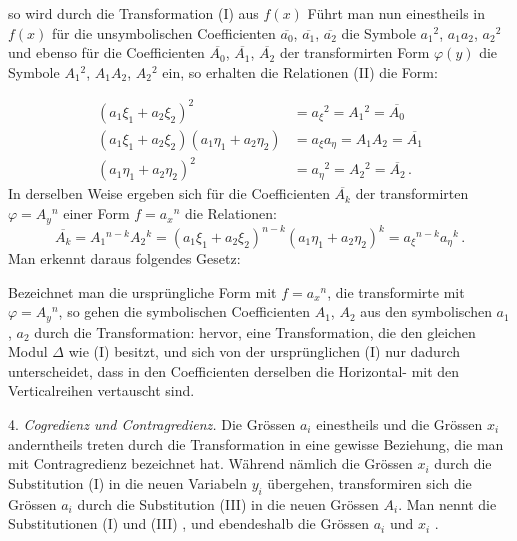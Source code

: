 so wird durch die Transformation (I) aus $f(x)$
Führt man nun einestheils in $f(x)$ für die unsymbolischen Coefficienten $\overline{a_0}$, $\overline{a_1}$, $\overline{a_2}$ die Symbole $a_1{}^2$, $a_1a_2$, $a_2{}^2$ und ebenso für die Coefficienten $\overline{A_0}$, $\overline{A_1}$, $\overline{A_2}$ der transformirten Form $\varphi(y)$ die Symbole $A_1{}^2$, $A_1A_2$, $A_2{}^2$ ein, so erhalten die Relationen (II) die Form:


\[
\begin{aligned}
(a_1\xi_1+a_2\xi_2)^2 &= a_\xi{}^2 = A_1{}^2 = \overline{A_0} \\
(a_1\xi_1+a_2\xi_2)(a_1\eta_1+a_2\eta_2) &= a_\xi a_\eta = A_1A_2 = \overline{A_1} \\
(a_1\eta_1+a_2\eta_2)^2 &= a_\eta{}^2 = A_2{}^2 = \overline{A_2}\,.
\end{aligned}
\]
In derselben Weise ergeben sich für die Coefficienten $\overline{A_k}$ der transformirten $\varphi = A_y{}^n$ einer Form $f = a_x{}^n$ die Relationen:
\[
\overline{A_k} = A_1{}^{n-k}A_2{}^k = (a_1\xi_1+a_2\xi_2)^{n-k}(a_1\eta_1+a_2\eta_2)^k = a_\xi{}^{n-k}a_\eta{}^k\,.
\]
Man erkennt daraus folgendes Gesetz:

\glqq Bezeichnet man die ursprüngliche Form mit $f = a_x{}^n$, die transformirte mit $\varphi = A_y{}^n$, so gehen die symbolischen Coefficienten $A_1$, $A_2$ aus den symbolischen $a_1$, $a_2$ durch die Transformation:
hervor, eine Transformation, die den gleichen Modul $\Delta$ wie (I) besitzt, und sich von der ursprünglichen (I) nur dadurch unterscheidet, dass in den Coefficienten derselben die Horizontal- mit den Verticalreihen vertauscht sind.\grqq{}

4. \textit{Cogredienz und Contragredienz.} Die Grössen $a_i$ einestheils und die Grössen $x_i$ anderntheils treten durch die Transformation in eine gewisse Beziehung, die man mit Contragredienz bezeichnet hat. Während nämlich die Grössen $x_i$ durch die Substitution (I) in die neuen Variabeln $y_i$ übergehen, transformiren sich die Grössen $a_i$ durch die Substitution (III) in die neuen Grössen $A_i$. Man nennt die Substitutionen (I) und (III) , und ebendeshalb die Grössen $a_i$ und $x_i$ .

